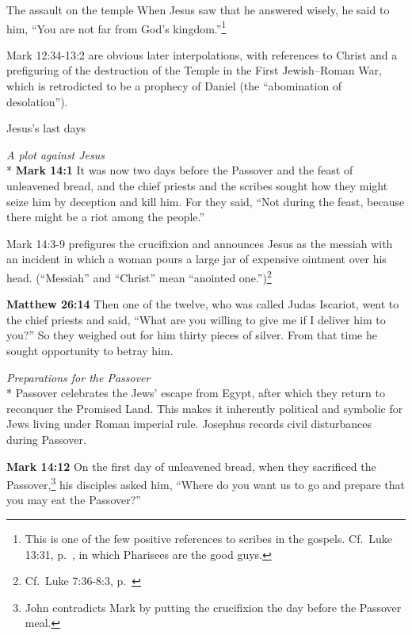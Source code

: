 \documentclass[10pt,twoside]{article} %
\newcommand{\quotesize}{\normalsize{}}
\newcommand{\comm}[1]{\begingroup \color{black!50} #1\endgroup}
\newenvironment{quotetext}{\begingroup\quotesize}{\endgroup}
\newcommand{\intex}[1]{\index[texts]{#1}}
\newcommand{\reftex}[1]{#1\intex{#1}}
\newcommand{\bible}[2]{\begin{quotetext}\textbf{#1}\intex{#1} #2\end{quotetext}}
\newcommand{\matthew}[2]{\bible{Matthew #1}{#2}}
\newcommand{\gospelmark}[2]{\bible{Mark #1}{#2}}
\newcommand{\subhead}[1]{\emph{#1}\\*}
\begin{document}
\begin{section}{The assault on the temple}
{  When Jesus saw that he answered wisely, he said to him, ``You are not far from God's kingdom.''\footnote{This is one of the few positive references
to scribes in the gospels. Cf.~Luke 13:31, p.~\pageref{good-pharisees}, in which Pharisees are the good guys.}\label{good-scribe}
}

\comm{Mark 12:34-13:2 are obvious later interpolations, with references to Christ and a prefiguring of the destruction of the
Temple in the First Jewish–Roman War, which is retrodicted to be a prophecy of 
Daniel (the ``abomination of desolation'').}

\end{section}

\begin{section}{Jesus's last days}

\subhead{A plot against Jesus}
\gospelmark{14:1}{
It was now two days before the Passover and the feast of unleavened bread, and the chief priests and the scribes sought how they might seize him by deception and kill him.   For they said, ``Not during the feast, because there might be a riot among the people.''}

\comm{\reftex{Mark 14:3-9} prefigures the crucifixion and announces Jesus as the messiah with an incident in which a woman pours a large jar of
expensive ointment over his head. (``Messiah'' and ``Christ'' mean ``anointed one.'')\footnote{Cf.~Luke 7:36-8:3, p.~\pageref{luke-woman-anointing}}}

\matthew{26:14}{
Then one of the twelve, who was called Judas Iscariot, went to the chief priests   and said, ``What are you willing to give me if I deliver him to you?'' So they weighed out for him thirty pieces of silver.   From that time he sought opportunity to betray him.
}

\subhead{Preparations for the Passover}
\comm{Passover celebrates the Jews' escape from Egypt, after which they return to reconquer the Promised Land. This makes it
inherently political and symbolic for Jews living under Roman imperial rule. 
Josephus records civil disturbances during Passover.}

\gospelmark{14:12}{
  On the first day of unleavened bread, when they sacrificed the Passover,\footnote{John contradicts Mark by putting the crucifixion the day before
the Passover meal.}
his disciples asked him, ``Where do you want us to go and prepare that you may eat the Passover?''
}


\end{section}
\end{document}
